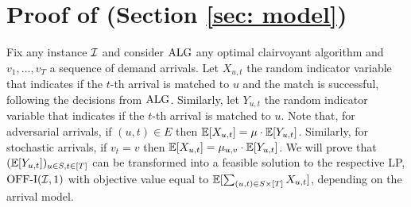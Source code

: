 \section{Proof of  (Section \ref{sec: model})}
\label{proof: offline is upper bound}
    Fix any instance $\mathcal I$ and consider $\mathrm{ALG}$ any optimal clairvoyant algorithm and $v_1, \ldots, v_T$ a sequence of demand arrivals.  Let $X_{u,t}$ the random indicator variable that indicates if the $t$-th arrival is matched to $u$ and the match is successful, following the decisions from $\mathrm{ALG}$. Similarly, 
   let $Y_{u,t}$ the random indicator variable that indicates if the $t$-th arrival is matched to $u$. Note that, for adversarial arrivals, if $(u,t) \in E$ then $\mathbb E[X_{u,t}] = \mu \cdot \mathbb E[Y_{u,t}]$. Similarly, for stochastic arrivals, if $v_t = v$ then $\mathbb E[X_{u,t}] = \mu_{u,v} \cdot \mathbb E[Y_{u,t}]$.
   We will prove that $(\mathbb E[Y_{u,t}])_{u \in S, t \in [T]}$ can be transformed into a feasible solution to the respective LP, $\mathrm{\mathrm{OFF}}\textrm{-}\mathrm{I}(\mathcal I, 1)$ with objective value equal to $\mathbb E[\sum_{(u,t) \in S \times [T]}  X_{u,t}]$, depending on the arrival model.

